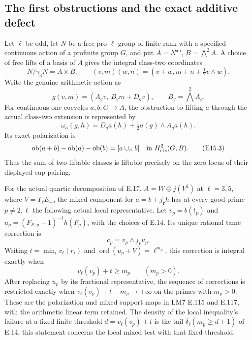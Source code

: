 \subsection{The first obstructions and the exact additive defect}

\begin{theorem}
\label{E-polarization}
Let $\ell$ be odd, let $N$ be a free pro-$\ell$ group of
finite rank with a specified continuous action of a
profinite group $G$, and put
$A=N^{\mathrm{ab}}$, $B=\bigwedge^2 A$.
A choice of free lifts of a basis of $A$ gives the integral
class-two coordinates
\[
 N/\gamma_3N=A\times B,\qquad
 (v,m)(w,n)=(v+w,m+n+\tfrac12v\wedge w).
 \tag{E15.1}
\]
Write the genuine arithmetic action as
\[
 g(v,m)=(A_gv,\ B_gm+D_gv),\qquad
 B_g=\bigwedge^2 A_g.
\]
For continuous one-cocycles $a,b:G\to A$, the obstruction
to lifting $a$ through the actual class-two extension is
represented by
\[
 \omega_a(g,h)=D_g a(h)+\tfrac12a(g)\wedge A_g a(h).
 \tag{E15.2}
\]
Its exact polarization is
\[
 \operatorname{ob}(a+b)-\operatorname{ob}(a)
       -\operatorname{ob}(b)=[a\cup_{\wedge}b]
       \quad\text{in }H^2_{\rm cts}(G,B).
 \tag{E15.3}
\]
Thus the sum of two liftable classes is liftable precisely
on the zero locus of their displayed cup pairing.

For the actual quartic decomposition of E.17,
$A=W\oplus j(V^3)$ at
$\ell=3,5$, where $V=T_\ell E_+$, the mixed component
for $a=b+j_{\mathbf r}h$ has at every good prime
$p\ne2,\ell$ the following actual local representative.
Let $v_p=b(t_p)$ and
$u_p=(F_{E,p}-1)^{-1}h(F_p)$, with the choices of E.14.
Its unique rational tame correction is
\[
 c_p=v_p\wedge j_{\mathbf r}u_p .
 \tag{E15.4}
\]
Writing $t=\min_i v_\ell(r_i)$ and
$\operatorname{ord}(u_p+V)=\ell^{m_p}$, this correction
is integral exactly when
\[
 v_\ell(v_p)+t\ge m_p\qquad(m_p>0).
 \tag{E15.5}
\]
After replacing $u_p$ by its fractional representative,
the sequence of corrections is restricted exactly when
$v_\ell(v_p)+t-m_p\to+\infty$ on the primes with $m_p>0$.
These are the polarization and mixed support maps in
LM7 E.115 and E.117, with the arithmetic linear term
retained. The density of the local inequality's failure
at a fixed finite threshold $d=v_\ell(v_p)+t$ is the
tail $\delta_\ell(m_p\ge d+1)$ of E.14; this statement
concerns the local mixed test with that fixed threshold.
\end{theorem}
